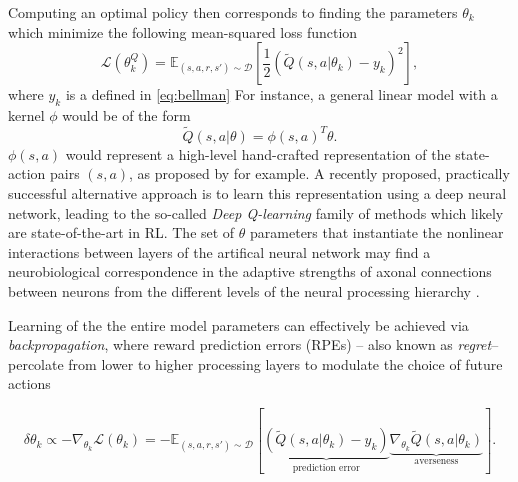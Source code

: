 \documentclass[10pt,letterpaper]{article}
\begin{document}
Computing an optimal policy then corresponds to finding the parameters $\theta_{k}$ which minimize the following mean-squared loss function
\begin{equation}
  \mathcal L(\theta^Q_{k})
  = \mathbb E_{(s, a, r, s') \sim \mathcal D}\left[\frac{1}{2}(\tilde{Q}(s, a|\theta_{k}) - y_k)^2\right],
  \label{eq:oracle}
\end{equation}
where $y_k$ is a defined in \eqref{eq:bellman}
For instance, a general linear model with a kernel $\phi$ would be of the
form
$$\tilde{Q}(s, a|\theta) = \phi(s,a)^T\theta.$$
$\phi(s,a)$ would represent a high-level hand-crafted representation of the state-action pairs
$(s,a)$, as proposed by \citep{songNIPS2016} for example.
A recently proposed, practically successful alternative approach
\citep{mnih2015,silver2016mastering} is to learn this
representation using a deep neural network, leading to the so-called \textit{Deep Q-learning} family of methods which
likely are state-of-the-art in RL.
The set of $\theta$ parameters that instantiate the nonlinear interactions
between layers of the artifical neural network
may find a neurobiological correspondence in the adaptive strengths of axonal
connections between neurons from the different levels
of the neural processing hierarchy
\citep{mesulam1998sensation, taylor2015global}.



Learning
of the the entire model parameters can effectively be achieved
via \textit{backpropagation},
where reward prediction errors (RPEs) -- also known as \textit{regret}-- percolate
from lower to higher processing layers to modulate the choice of future actions

\begin{equation}
  \delta \theta_{k} \propto -\nabla_{\theta_{k}}\mathcal L(\theta_{k})
  = -\mathbb E_{(s, a, r, s') \sim \mathcal D}[\underbrace{(\tilde{Q}(s, a|\theta_{k}) - y_k)}_{\text{prediction error}}
    \underbrace{\nabla_{\theta_{k}}\tilde{Q}(s, a|\theta_{k})}_{\text{averseness}}].
  \label{eq:oracle}
\end{equation}
\end{document}
